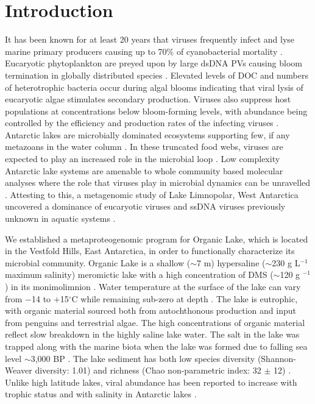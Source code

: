 \section{Introduction}
\acresetall
It has been known for at least 20 years that viruses frequently infect and lyse marine primary producers causing up to 70\% of cyanobacterial mortality \cite{Proctor1990,Suttle1990}.
Eucaryotic phytoplankton are preyed upon by large ds\textsc{DNA} \acp{PV} causing bloom termination in globally distributed species \cite{Nagasaki1994, Jacobsen1996, Wilson2002, Martinez-Martinez2007}.
Elevated levels of \ac{DOC} \cite{Eberlein1985} and numbers of heterotrophic bacteria \cite{Davidson1992, Bratbak1998b, Castberg2001} occur during algal blooms indicating that viral lysis of eucaryotic algae stimulates secondary production. 
Viruses also suppress host populations at concentrations below bloom-forming levels, with abundance being controlled by the efficiency and production rates of the infecting viruses \cite{Larsen2001, Bouvier2007}. 
Antarctic lakes are microbially dominated ecosystems supporting few, if any metazoans in the water column \cite{Laybourn-Parry1997}. 
In these truncated food webs, viruses are expected to play an increased role in the microbial loop \cite{Madan2005}. 
Low complexity Antarctic lake systems are amenable to whole community based molecular analyses where the role that viruses play in microbial dynamics can be unravelled \cite{Lauro2011}. 
Attesting to this, a metagenomic study of Lake Limnopolar, West Antarctica uncovered a dominance of eucaryotic viruses and ss\textsc{DNA} viruses previously unknown in aquatic systems \cite{Lopez-Bueno2009}. 

We established a metaproteogenomic program for Organic Lake, which is located in the Vestfold Hills, East Antarctica, in order to functionally characterize its microbial community. 
Organic Lake is a shallow ($\sim$7 m) hypersaline ($\sim$230 g L$^{-1}$ maximum salinity) meromictic lake with a high concentration of \ac{DMS} ($\sim$120 \textmu{}g $^{-1}$) in its monimolimnion \cite{Gibson1991, Roberts1993b}. 
Water temperature at the surface of the lake can vary from $-$14 to $+$15$^{\circ}$C while remaining sub-zero at depth \cite{Franzmann1987b, Gibson1999}. 
The lake is eutrophic, with organic material sourced both from autochthonous production and input from penguins and terrestrial algae. 
The high concentrations of organic material reflect slow breakdown in the highly saline lake water. 
The salt in the lake was trapped along with the marine biota when the lake was formed due to falling sea level $\sim$3,000 BP \cite{Bird1991, Zwartz1998}. 
The lake sediment has both low species diversity (Shannon-Weaver diversity: 1.01) and richness (Chao non-parametric index: 32 $\pm$ 12) \cite{Bowman2000b}. 
Unlike high latitude lakes, viral abundance has been reported to increase with trophic status \cite{Madan2005} and with salinity in Antarctic lakes \cite{Laybourn-Parry2001}. 


